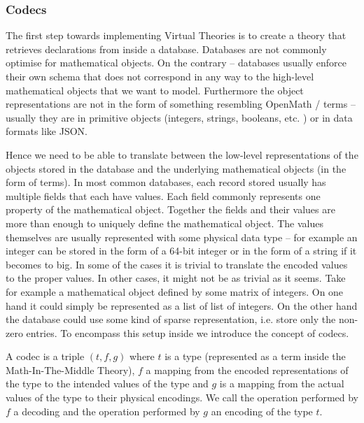 \subsubsection{Codecs}

The first step towards implementing Virtual Theories is to create a theory that retrieves
declarations from inside a database. Databases are not commonly optimise for mathematical
objects. On the contrary -- databases usually enforce their own schema that does not
correspond in any way to the high-level mathematical objects that we want to
model. Furthermore the object representations are not in the form of something resembling
OpenMath / \MMT terms -- usually they are in primitive objects (integers, strings,
booleans, etc. ) or in data formats like JSON.

Hence we need to be able to translate between the low-level representations of the objects
stored in the database and the underlying mathematical objects (in the form of \MMT terms). In
most common databases, each record stored usually has multiple fields that each have values.
Each field commonly represents one property of the mathematical object. Together the fields and
their values are more than enough to uniquely define the mathematical object. The values
themselves are usually represented with some physical data type -- for example an integer can
be stored in the form of a 64-bit integer or in the form of a string if it becomes to big. In
some of the cases it is trivial to translate the encoded values to the proper values. In other
cases, it might not be as trivial as it seems. Take for example a mathematical object defined
by some matrix of integers. On one hand it could simply be represented as a list of list of
integers. On the other hand the database could use some kind of sparse representation, i.e.
store only the non-zero entries. To encompass this setup inside \MMT we introduce the concept
of codecs.

\begin{mydef}[Codec]
  A codec is a triple $(t, f, g)$ where $t$ is a type (represented as a term inside the
  Math-In-The-Middle Theory), $f$ a mapping from the encoded representations of the type
  to the intended values of the type and $g$ is a mapping from the actual values of the
  type to their physical encodings. We call the operation performed by $f$ a decoding and
  the operation performed by $g$ an encoding of the type $t$.
\end{mydef}

